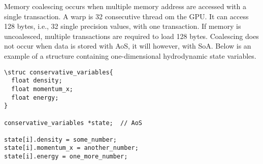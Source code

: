 Memory coalescing occurs when multiple memory address are accessed with a single transaction.  A warp is 32 consecutive thread om the GPU.  It can access 128 bytes, i.e., 32 single precision values, with one transaction.  If memory is uncoalesced, multiple transactions are required to load 128 bytes.  Coalescing does not occur when data is stored with AoS, it will however, with SoA.  Below is an example of a structure containing one-dimensional hydrodynamic state variables.
\begin{lstlisting}
\struc conservative_variables{
  float density;
  float momentum_x;
  float energy;
}

conservative_variables *state;  // AoS

state[i].density = some_number;
state[i].momentum_x = another_number;
state[i].energy = one_more_number;
\end{lstlisting} 

